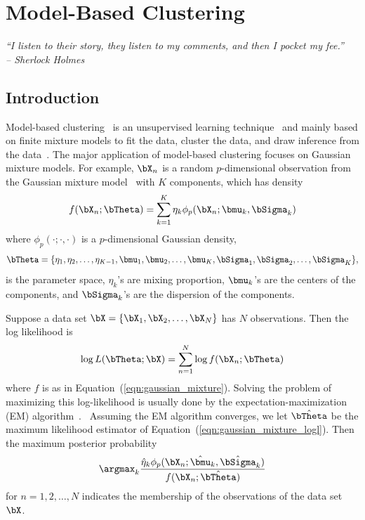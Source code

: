 
\chapter{Model-Based Clustering}
\label{chp:pmclust}


{\it
``I listen to their story, they listen to my comments, and then I
pocket my fee.'' \\
\--- Sherlock Holmes
}


\section{Introduction}

Model-based clustering~
is an unsupervised learning technique~
and mainly based on finite mixture models to fit the data, cluster the data,
and draw inference from the data~\citep{Fraley2002,Melnykov2010}.
The major application of
model-based clustering focuses on Gaussian mixture models. For example,
$\bX_n$ is a random $p$-dimensional observation from
the Gaussian mixture model~
with $K$ components, which has density
\begin{equation}
f(\bX_n; \bTheta) = \sum_{k = 1}^K \eta_k \phi_p(\bX_n; \bmu_k, \bSigma_k)
\label{eqn:gaussian_mixture}
\end{equation}
where $\phi_p(\cdot;\cdot,\cdot)$ is a $p$-dimensional Gaussian density,
$$
\bTheta = \{\eta_1, \eta_2, \ldots, \eta_{K-1},
\bmu_1, \bmu_2, \ldots, \bmu_K, \bSigma_1, \bSigma_2, \ldots, \bSigma_K\},
$$
is the parameter space,
$\eta_k$'s are mixing proportion, $\bmu_k$'s are the centers of the components,
and $\bSigma_k$'s are the dispersion of the components.

Suppose a data set $\bX = \{\bX_1, \bX_2, \ldots, \bX_N\}$ has
$N$ observations.  Then the log likelihood is
\begin{equation}
\log L(\bTheta; \bX) = \sum_{n = 1}^N \log f(\bX_n; \bTheta)
\label{eqn:gaussian_mixture_logl}
\end{equation}
where $f$ is as in Equation~(\ref{eqn:gaussian_mixture}).
Solving the problem of maximizing this log-likelihood is usually done by the
expectation-maximization (EM)
algorithm~\citep{Dempster1977}.~
Assuming the EM algorithm converges, we let $\hat{\bTheta}$ be the
maximum likelihood estimator of Equation~(\ref{eqn:gaussian_mixture_logl}).
Then the maximum posterior probability
$$
\argmax_k
\frac{\hat{\eta}_k\phi_p(\bX_n; \hat{\bmu}_k, \hat{\bSigma}_k)
    }{f(\bX_n; \hat{\bTheta})}
$$
for $n = 1, 2, \ldots, N$
indicates the membership of the observations of the data set $\bX$.



